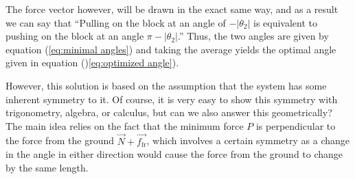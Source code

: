 \documentclass{article}
\begin{document}
The force vector however, will be drawn in the exact same way, and as a result we can say that ``Pulling on the block at an angle of $-|\theta_2|$ is equivalent to pushing on the block at an angle $\pi-|\theta_2|$.'' Thus, the two angles are given by equation (\ref{eq:minimal angles}) and taking the average yields the optimal angle given in equation ()\ref{eq:optimized angle}).

However, this solution is based on the assumption that the system has some inherent symmetry to it. Of course, it is very easy to show this symmetry with trigonometry, algebra, or calculus, but can we also answer this geometrically? The main idea relies on the fact that the minimum force $P$ is perpendicular to the force from the ground $\vec{N}+\vec{f_\text{fr}}$, which involves a certain symmetry as a change in the angle in either direction would cause the force from the ground to change by the same length.
\end{document}
